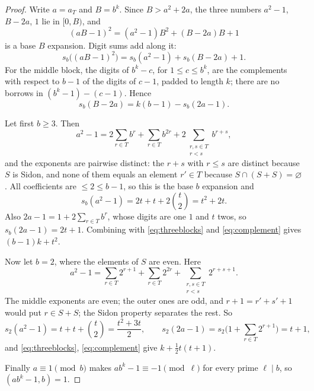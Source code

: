 \documentclass[11pt,reqno]{amsart}
\theoremstyle{plain}
\theoremstyle{definition}
\begin{document}
\begin{proof}
Write $a=a_T$ and $B=b^{k}$. Since $B>a^{2}+2a$, the three numbers $a^{2}-1$, $B-2a$, $1$ lie in $[0,B)$, and
\[
(aB-1)^{2}=(a^{2}-1)B^{2}+(B-2a)B+1
\]
is a base $B$ expansion. Digit sums add along it:
\begin{equation}\label{eq:threeblocks}
s_b\big((aB-1)^{2}\big)=s_b(a^{2}-1)+s_b(B-2a)+1 .
\end{equation}
For the middle block, the digits of $b^{k}-c$, for $1\le c\le b^{k}$, are the complements with respect to $b-1$ of the digits of $c-1$, padded to length $k$; there are no borrows in $(b^k-1)-(c-1)$. Hence
\begin{equation}\label{eq:complement}
s_b(B-2a)=k(b-1)-s_b(2a-1).
\end{equation}

Let first $b\ge3$. Then
\[
a^{2}-1=2\sum_{r\in T}b^{r}+\sum_{r\in T}b^{2r}+2\sum_{\substack{r,s\in T\\ r<s}}b^{r+s},
\]
and the exponents are pairwise distinct: the $r+s$ with $r\le s$ are distinct because $S$ is Sidon, and none of them equals an element $r'\in T$ because $S\cap(S+S)=\varnothing$. All coefficients are $\le2\le b-1$, so this is the base $b$ expansion and
\[
s_b(a^{2}-1)=2t+t+2\binom t2=t^{2}+2t .
\]
Also $2a-1=1+2\sum_{r\in T}b^{r}$, whose digits are one $1$ and $t$ twos, so $s_b(2a-1)=2t+1$. Combining with \eqref{eq:threeblocks} and \eqref{eq:complement} gives $(b-1)k+t^{2}$.

Now let $b=2$, where the elements of $S$ are even. Here
\[
a^{2}-1=\sum_{r\in T}2^{r+1}+\sum_{r\in T}2^{2r}+\sum_{\substack{r,s\in T\\ r<s}}2^{r+s+1}.
\]
The middle exponents are even; the outer ones are odd, and $r+1=r'+s'+1$ would put $r\in S+S$; the Sidon property separates the rest. So
\[
s_2(a^{2}-1)=t+t+\binom t2=\frac{t^{2}+3t}2,
\qquad
s_2(2a-1)=s_2\Big(1+\sum_{r\in T}2^{r+1}\Big)=t+1,
\]
and \eqref{eq:threeblocks}, \eqref{eq:complement} give $k+\tfrac12 t(t+1)$.

Finally $a\equiv1\pmod b$ makes $a b^{k}-1\equiv-1\pmod{\ell}$ for every prime $\ell\mid b$, so $(ab^{k}-1,b)=1$.
\end{proof}
\end{document}
